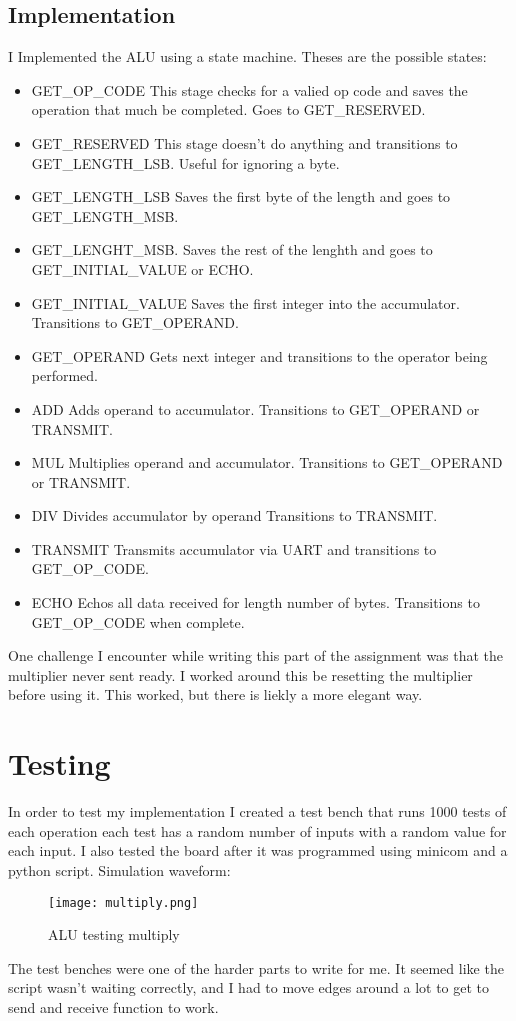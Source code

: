 \documentclass{article}
\begin{document}
\subsection{Implementation}

I Implemented the ALU using a state machine. Theses are the possible states:
\begin{itemize}
  \item GET\_OP\_CODE
This stage checks for a valied op code and saves the operation that much be completed. Goes to GET\_RESERVED.
  \item GET\_RESERVED
This stage doesn't do anything and transitions to GET\_LENGTH\_LSB. Useful for ignoring a byte.
  \item GET\_LENGTH\_LSB
Saves the first byte of the length and goes to GET\_LENGTH\_MSB.
  \item GET\_LENGHT\_MSB.
Saves the rest of the lenghth and goes to GET\_INITIAL\_VALUE or ECHO.
  \item GET\_INITIAL\_VALUE
Saves the first integer into the accumulator. Transitions to GET\_OPERAND.
  \item GET\_OPERAND
Gets next integer and transitions to the operator being performed.
  \item ADD
Adds operand to accumulator. Transitions to GET\_OPERAND or TRANSMIT.
  \item MUL
Multiplies operand and accumulator. Transitions to GET\_OPERAND or TRANSMIT.
  \item DIV
Divides accumulator by operand Transitions to TRANSMIT.
  \item TRANSMIT
Transmits accumulator via UART and transitions to GET\_OP\_CODE.
  \item ECHO
Echos all data received for length number of bytes. Transitions to GET\_OP\_CODE when complete.

\end{itemize}

One challenge I encounter while writing this part of the assignment was that the multiplier never sent ready. I worked around this be resetting the multiplier before using it. This worked, but there is liekly a more elegant way.
\section{Testing}
In order to test my implementation I created a test bench that runs 1000 tests of each operation each test has a random number of inputs with a random value for each input. I also tested the board after it was programmed using minicom and a python script. Simulation waveform:

\begin{figure}[h!]
  \centering
  \texttt{[image: multiply.png]}
  \caption{ALU testing multiply}
\end{figure}


The test benches were one of the harder parts to write for me. It seemed like the script wasn't waiting correctly, and I had to move edges around a lot to get to send and receive function to work.
\end{document}
